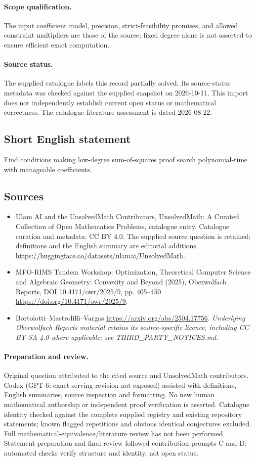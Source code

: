 \documentclass[11pt]{article}
\begin{document}
\paragraph{Scope qualification.}
The input coefficient model, precision, strict-feasibility promises, and allowed constraint multipliers are those of the source; fixed degree alone is not asserted to ensure efficient exact computation.
\paragraph{Source status.}
The supplied catalogue labels this record partially solved. Its source-status metadata was checked against the supplied snapshot on 2026-10-11. This import does not independently establish current open status or mathematical correctness. The catalogue literature assessment is dated 2026-08-22.
\subsection{Short English statement}
Find conditions making low-degree sum-of-squares proof search polynomial-time with manageable coefficients.
\subsection{Sources}
\begin{itemize}
\item[S1] Ulam AI and the UnsolvedMath Contributors, UnsolvedMath: A Curated Collection of Open Mathematics Problems, catalogue entry. Catalogue curation and metadata: CC BY 4.0. The supplied source question is retained; definitions and the English summary are editorial additions.
\url{https://huggingface.co/datasets/ulamai/UnsolvedMath}.
\item[S2] MFO-RIMS Tandem Workshop: Optimization, Theoretical Computer Science and Algebraic Geometry: Convexity and Beyond (2025), Oberwolfach Reports, DOI 10.4171/owr/2025/9, pp. 405--450
\url{https://doi.org/10.4171/owr/2025/9}.
\item[S3] Bortolotti--Mastrolilli--Vargas
\url{https://arxiv.org/abs/2504.17756}.
\textit{Underlying Oberwolfach Reports material retains its source-specific licence, including CC BY-SA 4.0 where applicable; see THIRD\_PARTY\_NOTICES.md.}
\end{itemize}
\paragraph{Preparation and review.}
Original question attributed to the cited source and UnsolvedMath contributors. Codex (GPT-6; exact serving revision not exposed) assisted with definitions, English summaries, source inspection and formatting. No new human mathematical authorship or independent proof verification is asserted. Catalogue identity checked against the complete supplied registry and existing repository statements; known flagged repetitions and obvious identical conjectures excluded. Full mathematical-equivalence/literature review has not been performed. Statement preparation and final review followed contribution prompts C and D; automated checks verify structure and identity, not open status.
\label{end:statement}
\end{document}
